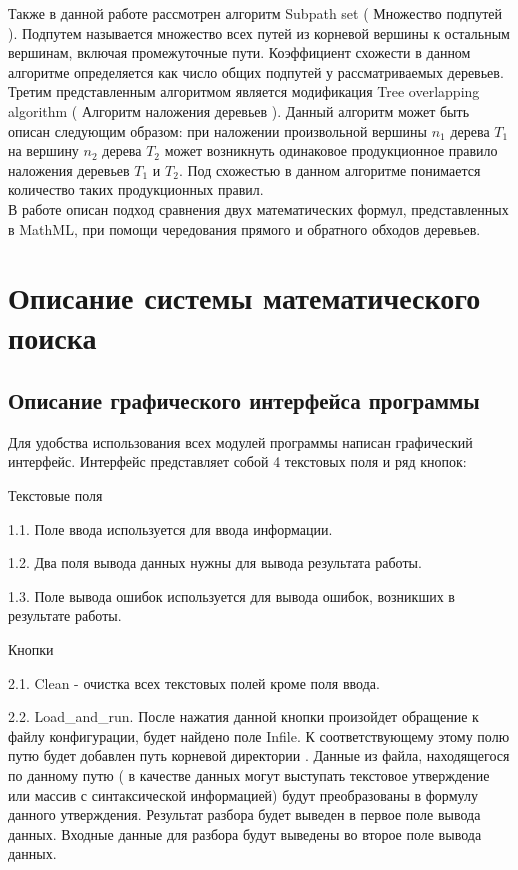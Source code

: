 \documentclass[12pt]{article}
\begin{document}
Также в данной работе рассмотрен алгоритм Subpath set ( Множество подпутей ). Подпутем называется множество всех путей из корневой вершины к остальным вершинам, включая промежуточные пути. Коэффициент схожести в данном алгоритме определяется как число общих подпутей у рассматриваемых деревьев. \\

Третим представленным алгоритмом является  модификация Tree overlapping algorithm ( Алгоритм наложения деревьев ). Данный алгоритм может быть описан следующим образом: при наложении произвольной вершины $n_1$ дерева $T_1$  на вершину $n_2$ дерева $T_2$ может возникнуть одинаковое продукционное правило наложения деревьев $T_1$ и $T_2$. Под схожестью в данном алгоритме понимается количество таких продукционных правил. \\

В работе \cite{Yuping} описан подход сравнения двух математических формул, представленных в MathML,  при помощи чередования прямого и обратного обходов деревьев.

\newpage
\section{Описание системы математического поиска}
\subsection{Описание графического интерфейса программы}
Для удобства использования всех модулей программы написан графический интерфейс. Интерфейс представляет собой 4 текстовых поля и ряд кнопок:\\

\begin{center} Текстовые поля \end{center}

1.1. Поле ввода используется для ввода информации.

1.2. Два поля вывода данных нужны для вывода результата работы.

1.3. Поле вывода ошибок  используется для вывода ошибок, возникших в результате работы.

\begin{center} Кнопки \end{center}

2.1. Clean - очистка всех текстовых полей кроме поля ввода.

2.2. Load\_and\_run. После нажатия данной кнопки произойдет обращение к файлу конфигурации, будет найдено поле Infile. К соответствующему этому полю путю будет добавлен путь корневой директории .
Данные из  файла, находящегося по данному путю ( в качестве данных могут выступать текстовое утверждение или массив с синтаксической информацией) будут преобразованы в формулу данного утверждения.
 Результат разбора будет выведен в первое поле вывода данных. Входные данные для разбора будут выведены во второе поле вывода данных.
\end{document}
